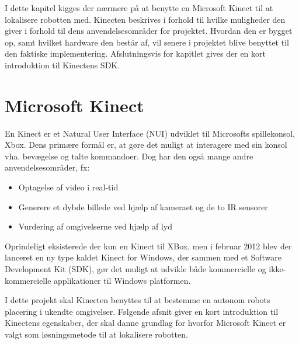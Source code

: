 I dette kapitel kigges der nærmere på at benytte en Microsoft Kinect til at lokalisere robotten med.
Kinecten beskrives i forhold til hvilke muligheder den giver i forhold til dens anvendelsesområder for projektet.
Hvordan den er bygget op, samt hvilket hardware den består af, vil senere i projektet blive benyttet til den faktiske implementering.
Afslutningsvis for kapitlet gives der en kort introduktion til Kinectens SDK.

 \section{Microsoft Kinect}\label{kinect}
En Kinect er et Natural User Interface (NUI) udviklet til Microsofts spillekonsol, Xbox.
Dens primære formål er, at gøre det muligt at interagere med sin konsol vha. bevægelse og talte kommandoer.
Dog har den også mange andre anvendelsesområder, fx:
%

\begin{itemize}
\item Optagelse af video i real-tid
\item Generere et dybde billede ved hjælp af kameraet og de to IR sensorer
\item Vurdering af omgivelserne ved hjælp af lyd
\end{itemize}

Oprindeligt eksisterede der kun en Kinect til XBox, men i februar 2012 blev der lanceret en ny type kaldet Kinect for Windows, der sammen med et Software Development Kit (SDK), gør det muligt at udvikle både kommercielle og ikke-kommercielle applikationer til Windows platformen.

I dette projekt skal Kinecten benyttes til at bestemme en autonom robots placering i ukendte omgivelser. 
Følgende afsnit giver en kort introduktion til Kinectens egenskaber, der skal danne grundlag for hvorfor Microsoft Kinect er valgt som løsningsmetode til at lokalisere robotten.\cite{kinectProgrammingGuide}

